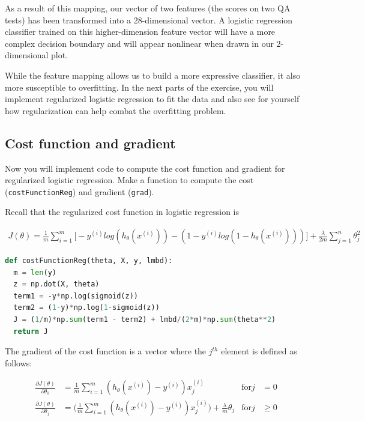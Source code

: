 \documentclass[12pt]{article}
\begin{document}
As a result of this mapping, our vector of two features (the scores on two QA tests) has been transformed into a 28-dimensional vector. A logistic regression classifier trained on this higher-dimension feature vector will have
a more complex decision boundary and will appear nonlinear when drawn in our 2-dimensional plot.

While the feature mapping allows us to build a more expressive classifier, it also more susceptible to overfitting. In the next parts of the exercise, you will implement regularized logistic regression to fit the data and also see for yourself how regularization can help combat the overfitting problem.


\subsection{Cost function and gradient} \label{val:costawal}

Now you will implement code to compute the cost function and gradient for regularized logistic regression. Make a function to compute the cost (\texttt{costFunctionReg}) and gradient (\texttt{grad}). 

Recall that the regularized cost function in logistic regression is

\begin{align}
  J(\theta) = \frac{1}{m}\sum_{i=1}^m{\big[-y^{(i)}log(h_\theta(x^{(i)}))-(1-y^{(i)}log(1-h_\theta(x^{(i)})))\big]} + \frac{\lambda}{2m}\sum_{j=1}^n{\theta_j^2}
\end{align}

\begin{lstlisting}[language=Python]
  def costFunctionReg(theta, X, y, lmbd):
  m = len(y)
  z = np.dot(X, theta)
  term1 = -y*np.log(sigmoid(z))
  term2 = (1-y)*np.log(1-sigmoid(z))
  J = (1/m)*np.sum(term1 - term2) + lmbd/(2*m)*np.sum(theta**2)
  return J
\end{lstlisting}

The gradient of the cost function is a vector where the $j^{th}$ element is defined as follows:

\begin{align}
  \frac{\partial J(\theta)}{\partial \theta_0} & = \frac{1}{m}\sum_{i=1}^m{(h_\theta(x^{(i)})-y^{(i)}) x_j^{(i)}} & \text{for} j & = 0 \\
  \frac{\partial J(\theta)}{\partial \theta_j} & = \bigg(\frac{1}{m}\sum_{i=1}^m{(h_\theta(x^{(i)})-y^{(i)}) x_j^{(i)}}\bigg) + \frac{\lambda}{m}\theta_j & \text{for} j & \geq 0
\end{align}
\end{document}
